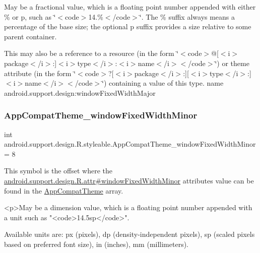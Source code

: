May be a fractional value, which is a floating point number appended with either \% or p, such as \char`\"{}$<$code$>$14.\%$<$/code$>$\char`\"{}. The \% suffix always means a percentage of the base size; the optional p suffix provides a size relative to some parent container. 

This may also be a reference to a resource (in the form \char`\"{}$<$code$>$@\mbox{[}$<$i$>$package$<$/i$>$\+:\mbox{]}$<$i$>$type$<$/i$>$\+:$<$i$>$name$<$/i$>$$<$/code$>$\char`\"{}) or theme attribute (in the form \char`\"{}$<$code$>$?\mbox{[}$<$i$>$package$<$/i$>$\+:\mbox{]}\mbox{[}$<$i$>$type$<$/i$>$\+:\mbox{]}$<$i$>$name$<$/i$>$$<$/code$>$\char`\"{}) containing a value of this type.  name android.\+support.\+design\+:window\+Fixed\+Width\+Major \mbox{\label{classandroid_1_1support_1_1design_1_1R_1_1styleable_ab0a6460ce03febb5815a97617555e4ac}} 
\subsubsection{\texorpdfstring{App\+Compat\+Theme\+\_\+window\+Fixed\+Width\+Minor}{AppCompatTheme\_windowFixedWidthMinor}}
{\footnotesize\ttfamily int android.\+support.\+design.\+R.\+styleable.\+App\+Compat\+Theme\+\_\+window\+Fixed\+Width\+Minor = 8\hspace{0.3cm}{\ttfamily [static]}}

This symbol is the offset where the \hyperlink{classandroid_1_1support_1_1design_1_1R_1_1attr_ad4eb274132a1e6ce7842da04eb6f1285}{android.\+support.\+design.\+R.\+attr\#window\+Fixed\+Width\+Minor} attribute\textquotesingle{}s value can be found in the \hyperlink{classandroid_1_1support_1_1design_1_1R_1_1styleable_afb351dc8de20cbd4c89abe360373010c}{App\+Compat\+Theme} array.

\begin{DoxyVerb}      <p>May be a dimension value, which is a floating point number appended with a unit such as "<code>14.5sp</code>".
\end{DoxyVerb}
 Available units are\+: px (pixels), dp (density-\/independent pixels), sp (scaled pixels based on preferred font size), in (inches), mm (millimeters). 

